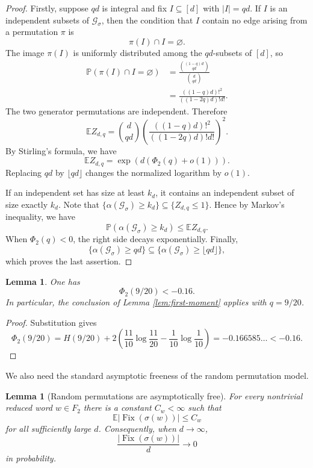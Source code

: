 \documentclass[12pt,a4paper]{amsart}
\newtheorem{lemma}[theorem]{Lemma}
\theoremstyle{definition}
\newcommand{\Fix}{\operatorname{Fix}}
\newcommand{\ind}{\alpha}
\newcommand{\cG}{\mathcal G}
\begin{document}
	\begin{proof}
		Firstly, suppose $qd$ is integral and fix $I\subseteq[d]$ with $|I|=qd$.  If $I$ is an independent subsets of $\cG_\sigma$, then the condition that $I$ contain no edge arising from a permutation $\pi$ is
		\[
		\pi(I)\cap I=\varnothing.
		\]
		The image $\pi(I)$ is uniformly distributed among the $qd$-subsets of $[d]$, so
		\begin{align*}
			\mathbb P(\pi(I)\cap I=\varnothing)
			&=\frac{\binom{(1-q)d}{qd}}{\binom d{qd}}\\
			&=\frac{((1-q)d)!^2}{((1-2q)d)!d!}.
		\end{align*}
		The two generator permutations are independent.  Therefore
		\[
		\mathbb E Z_{d,q}
		=\binom d{qd}
		\left(\frac{((1-q)d)!^2}{((1-2q)d)!d!}\right)^2.
		\]
	By	Stirling's formula, we have
  \[\mathbb E Z_{d,q}
		=\exp(d(\Phi_2(q)+o(1))).
		\]
  Replacing $qd$ by $\lfloor qd\rfloor$ changes the normalized logarithm by $o(1)$.
		
		If an independent set has size at least $k_d$, it contains an independent subset of size exactly $k_d$. Note that $\{\ind(\cG_\sigma)\ge k_d\}\subseteq\{Z_{d,q}\leq 1\}$.
        Hence by Markov's inequality, we have
		\[
		\mathbb P(\ind(\cG_\sigma)\ge k_d)
		\le \mathbb E Z_{d,q}.
		\]
		When $\Phi_2(q)<0$, the right side decays exponentially.  Finally,
		\[
		\{\ind(\cG_\sigma)\ge qd\}
		\subseteq
		\{\ind(\cG_\sigma)\ge \lfloor qd\rfloor\},
		\]
		which proves the last assertion.
	\end{proof}
	
	\begin{lemma}\label{lem:phi-negative}
		One has
		\[
		\Phi_2(9/20)<-0.16.
		\]
		In particular, the conclusion of Lemma \ref{lem:first-moment} applies with $q=9/20$.
	\end{lemma}
	
	\begin{proof}
		Substitution gives
		\[
		\Phi_2(9/20)
		=H(9/20)+2\left(\frac{11}{10}\log\frac{11}{20}
		-\frac1{10}\log\frac1{10}\right)
		=-0.166585\ldots<-0.16.
		\]
	\end{proof}
	
	We also need the standard asymptotic freeness of the random permutation model.
	
	\begin{lemma}[Random permutations are asymptotically free]\label{lem:random-free}
		For every nontrivial reduced word $w\in F_2$ there is a constant $C_w<\infty$ such that
		\[
		\mathbb E|\Fix(\sigma(w))|\le C_w
		\]
		for all sufficiently large $d$.  Consequently, when $d\longrightarrow\infty$,
		\[
		\frac{|\Fix(\sigma(w))|}{d}\longrightarrow0
		\]
		in probability.
	\end{lemma}
	
\end{document}
